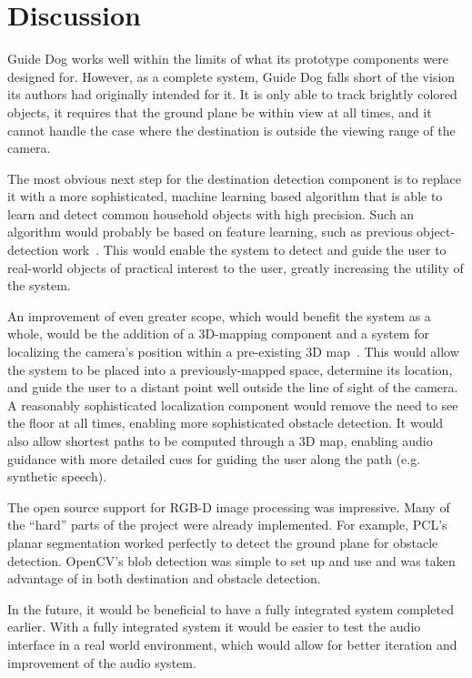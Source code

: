 \section{Discussion}
\label{sec:discussion}

Guide Dog works well within the limits of what its prototype components were
designed for. However, as a complete system, Guide Dog falls short of the 
vision its authors had originally intended for it. It is only able to track
brightly colored objects, it requires that the ground plane be within view
at all times, and it cannot handle the case where the destination is outside
the viewing range of the camera. 

The most obvious next step for the destination detection component is to
replace it with a more sophisticated, machine learning based algorithm that
is able to learn and detect common household objects with high precision.
Such an algorithm would probably be based on feature learning, such as
previous object-detection work~\cite{lai_icra12}.
This would enable the system to detect and guide the user to real-world
objects of practical interest to the user, greatly increasing the
utility of the system.

An improvement of even greater scope, which would benefit the system as
a whole, would be the addition of a 3D-mapping component and a system
for localizing the camera's position within a pre-existing 3D map~\cite{Du:2011:IMI:2030112.2030123}. This
would allow the system to be placed into a previously-mapped space,
determine its location, and guide the user to a distant point well
outside the line of sight of the camera. A reasonably sophisticated 
localization component would remove the need to see the floor at all
times, enabling more sophisticated obstacle detection. It would also
allow shortest paths to be computed through a 3D map, enabling audio
guidance with more detailed cues for guiding the user along the path
(e.g. synthetic speech).

The open source support for RGB-D image processing was impressive. Many of the
``hard'' parts of the project were already implemented. For example, PCL's
planar segmentation worked perfectly to detect the ground plane for obstacle
detection. OpenCV's blob detection was simple to set up and use and was taken
advantage of in both destination and obstacle detection.

In the future, it would be beneficial to have a fully integrated system
completed earlier. With a fully integrated system it would be easier to test the
audio interface in a real world environment, which would allow for better
iteration and improvement of the audio system.
